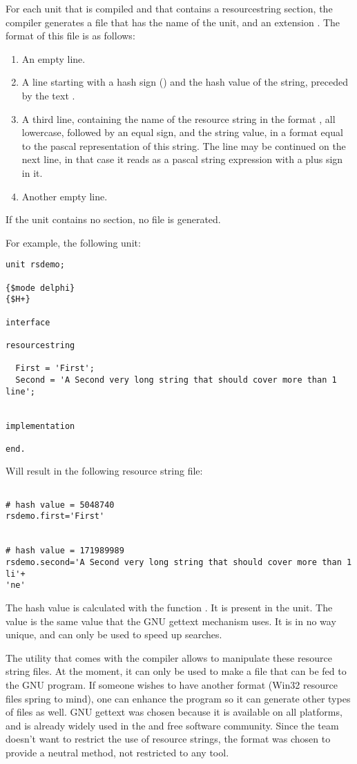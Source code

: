 For each unit that is compiled and that contains a resourcestring section,
the compiler generates a file that has the name of the unit, and an
extension . The format of this file is as follows:
\begin{enumerate}
\item An empty line.
\item A line starting with a hash sign (\var{\#}) and the hash value of the
  string, preceded by the text .
\item A third line, containing the name of the resource string in the format
, all lowercase, followed by an equal sign, and
the string value, in a format equal to the pascal representation of this
string. The line may be continued on the next line, in that case it reads as
a pascal string expression with a plus sign in it.
\item Another empty line.
\end{enumerate}
If the unit contains no  section, no file is generated.

For example, the following unit:
\begin{verbatim}
unit rsdemo;

{$mode delphi}
{$H+}

interface

resourcestring

  First = 'First';
  Second = 'A Second very long string that should cover more than 1 line';


implementation

end.
\end{verbatim}
Will result in the following resource string file:
\begin{verbatim}

# hash value = 5048740
rsdemo.first='First'


# hash value = 171989989
rsdemo.second='A Second very long string that should cover more than 1 li'+
'ne'

\end{verbatim}
The hash value is calculated with the function . It is present in
the  unit. The value is the same value that the GNU gettext
mechanism uses. It is in no way unique, and can only be used to speed up
searches.

The  utility that comes with the \fpc compiler allows to
manipulate these resource string files. At the moment, it can only be used
to make a  file that can be fed to the GNU  program.
If someone wishes to have another format (Win32 resource files spring to
mind), one can enhance the  program so it can generate
other types of files as well. GNU gettext was chosen because it is available
on all platforms, and is already widely used in the  and free
software community. Since the \fpc team doesn't want to restrict the use
of resource strings, the  format was chosen to provide a neutral
method, not restricted to any tool.


